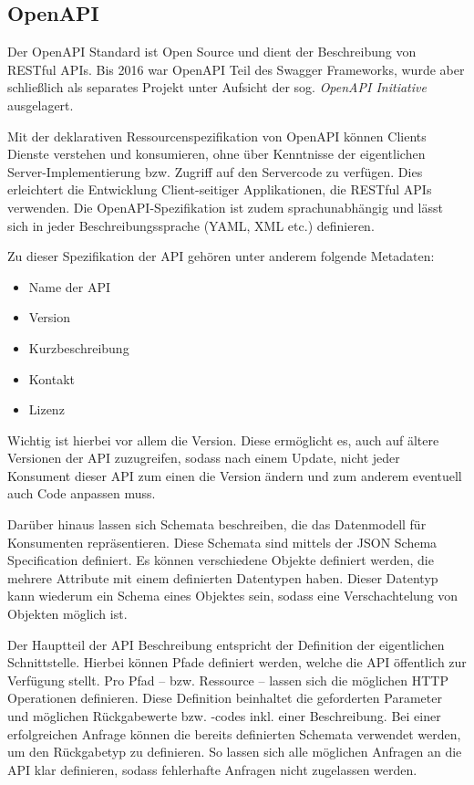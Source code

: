 		\subsection{OpenAPI} %
		
			Der OpenAPI Standard ist Open Source und dient der Beschreibung von RESTful APIs. Bis 2016 war OpenAPI Teil des Swagger Frameworks, wurde aber schließlich als separates Projekt unter Aufsicht der sog. \textit{OpenAPI Initiative} \cite{OpenAPIInitiative.3232020} ausgelagert. 
			
			Mit der deklarativen Ressourcenspezifikation von OpenAPI können Clients Dienste verstehen und konsumieren, ohne über Kenntnisse der eigentlichen Server-Implementierung bzw. Zugriff auf den Servercode zu verfügen. Dies erleichtert die Entwicklung Client-seitiger Applikationen, die RESTful APIs verwenden. Die OpenAPI-Spezifikation ist zudem sprachunabhängig und lässt sich in jeder Beschreibungssprache (\acs{YAML}, \acs{XML} etc.) definieren. 
			
			Zu dieser Spezifikation der API gehören unter anderem folgende Metadaten:
			
			\begin{itemize}
				\item Name der API
				\item Version
				\item Kurzbeschreibung
				\item Kontakt
				\item Lizenz
			\end{itemize}
		
			Wichtig ist hierbei vor allem die Version. Diese ermöglicht es, auch auf ältere Versionen der \acs{API} zuzugreifen, sodass nach einem Update, nicht jeder Konsument dieser \acs{API} zum einen die Version ändern und zum anderem eventuell auch Code anpassen muss.
			
			Darüber hinaus lassen sich Schemata beschreiben, die das Datenmodell für Konsumenten repräsentieren. Diese Schemata sind mittels der \acs{JSON} Schema Specification definiert. Es können verschiedene Objekte definiert werden, die mehrere Attribute mit einem definierten Datentypen haben. Dieser Datentyp kann wiederum ein Schema eines Objektes sein, sodass eine Verschachtelung von Objekten möglich ist.
			
			Der Hauptteil der API Beschreibung entspricht der Definition der eigentlichen Schnittstelle. Hierbei können Pfade definiert werden, welche die API öffentlich zur Verfügung stellt. Pro Pfad -- bzw. Ressource -- lassen sich die möglichen \acs{HTTP} Operationen definieren. Diese Definition beinhaltet die geforderten Parameter und möglichen Rückgabewerte bzw. -codes inkl. einer Beschreibung. Bei einer erfolgreichen Anfrage können die bereits definierten Schemata verwendet werden, um den Rückgabetyp zu definieren. So lassen sich alle möglichen Anfragen an die \acs{API} klar definieren, sodass fehlerhafte Anfragen nicht zugelassen werden.
			
